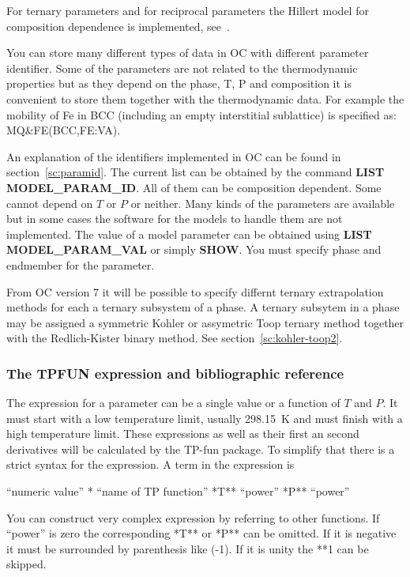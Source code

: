 \documentclass[11pt]{article}
\begin{document}
For ternary parameters and for reciprocal parameters the Hillert model
for composition dependence is implemented, see~\cite{07Luk}.

You can store many different types of data in OC with different
parameter identifier.  Some of the parameters are not related to the
thermodynamic properties but as they depend on the phase, T, P and
composition it is convenient to store them together with the
thermodynamic data.  For example the mobility of Fe in BCC (including
an empty interstitial sublattice) is specified as: MQ\&FE(BCC,FE:VA).

An explanation of the identifiers implemented in OC can be found in
section~\ref{sc:paramid}.  The current list can be obtained by the
command {\bf LIST MODEL\_PARAM\_ID}.  All of them can be composition
dependent.  Some cannot depend on $T$ or $P$ or neither.  Many kinds
of the parameters are available but in some cases the software for the
models to handle them are not implemented.  The value of a model
parameter can be obtained using {\bf LIST MODEL\_PARAM\_VAL} or simply
{\bf SHOW}.  You must specify phase and endmember for the parameter.

From OC version 7 it will be possible to specify differnt ternary
extrapolation methods for each a ternary subsystem of a phase.  A
ternary subsytem in a phase may be assigned a symmetric Kohler or
assymetric Toop ternary method together with the Redlich-Kister binary
method.  See section~\ref{sc:kohler-toop2}.

\subsubsection{The TPFUN expression and bibliographic reference}\label{sc:tpfun}

The expression for a parameter can be a single value or a function of
$T$ and $P$.  It must start with a low temperature limit, usually
298.15~K and must finish with a high temperature limit.  These
expressions as well as their first an second derivatives will be
calculated by the TP-fun package.  To simplify that there is a strict
syntax for the expression.  A term in the expression is

``numeric value'' * ``name of TP function'' *T** ``power'' *P** ``power'' 

You can construct very complex expression by referring to other
functions.  If ``power'' is zero the corresponding *T** or *P** can be
omitted.  If it is negative it must be surrounded by parenthesis like
(-1).  If it is unity the **1 can be skipped.
\end{document}
